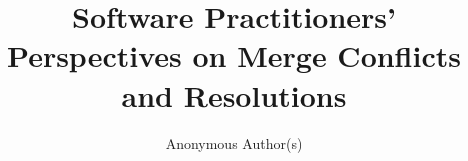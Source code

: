 \documentclass[conference]{IEEEtran}
\begin{document}
\title{Software Practitioners' Perspectives on Merge Conflicts and Resolutions}

\author{Anonymous Author(s)}

\maketitle
\thispagestyle{plain}
\pagestyle{plain}

\IEEEpeerreviewmaketitle







%


{}
\end{document}

